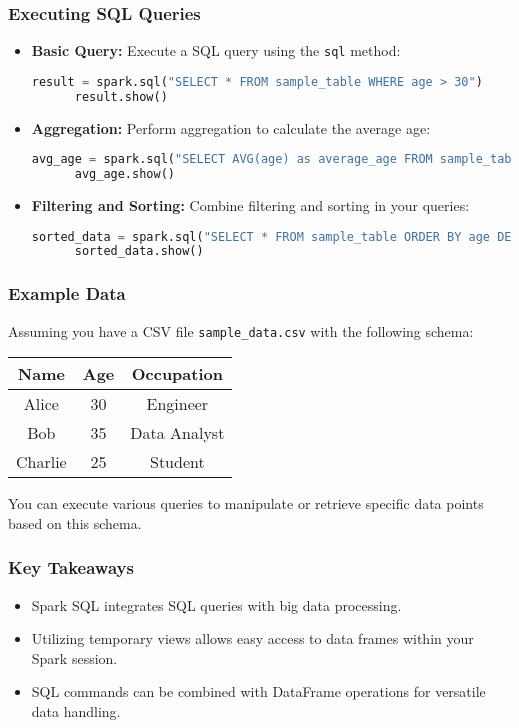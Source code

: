 \documentclass[aspectratio=169]{beamer}
\begin{document}
\begin{frame}[fragile]
  \frametitle{Executing SQL Queries}
  \begin{itemize}
    \item \textbf{Basic Query:}
      Execute a SQL query using the \texttt{sql} method:
      \begin{lstlisting}[language=Python]
      result = spark.sql("SELECT * FROM sample_table WHERE age > 30")
      result.show()
      \end{lstlisting}
      
    \item \textbf{Aggregation:}
      Perform aggregation to calculate the average age:
      \begin{lstlisting}[language=Python]
      avg_age = spark.sql("SELECT AVG(age) as average_age FROM sample_table")
      avg_age.show()
      \end{lstlisting}

    \item \textbf{Filtering and Sorting:}
      Combine filtering and sorting in your queries:
      \begin{lstlisting}[language=Python]
      sorted_data = spark.sql("SELECT * FROM sample_table ORDER BY age DESC")
      sorted_data.show()
      \end{lstlisting}
  \end{itemize}
\end{frame}

\begin{frame}
  \frametitle{Example Data}
  Assuming you have a CSV file \texttt{sample\_data.csv} with the following schema:
  \begin{center}
    \begin{tabular}{|c|c|c|}
      \hline
      Name    & Age & Occupation \\
      \hline
      Alice   & 30  & Engineer    \\
      Bob     & 35  & Data Analyst \\
      Charlie & 25  & Student     \\
      \hline
    \end{tabular}
  \end{center}
  You can execute various queries to manipulate or retrieve specific data points based on this schema.
\end{frame}

\begin{frame}
  \frametitle{Key Takeaways}
  \begin{itemize}
    \item Spark SQL integrates SQL queries with big data processing.
    \item Utilizing temporary views allows easy access to data frames within your Spark session.
    \item SQL commands can be combined with DataFrame operations for versatile data handling.
  \end{itemize}
\end{frame}
\end{document}
